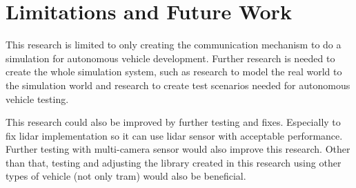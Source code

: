 \section{Limitations and Future Work}

This research is limited to only creating the communication mechanism to do a
simulation for autonomous vehicle development. Further research is needed to
create the whole simulation system, such as research to model the real world to
the simulation world and research to create test scenarios needed for autonomous
vehicle testing.

This research could also be improved by further testing and fixes. Especially to
fix lidar implementation so it can use lidar sensor with acceptable performance.
Further testing with multi-camera sensor would also improve this research. Other
than that, testing and adjusting the library created in this research using
other types of vehicle (not only tram) would also be beneficial.